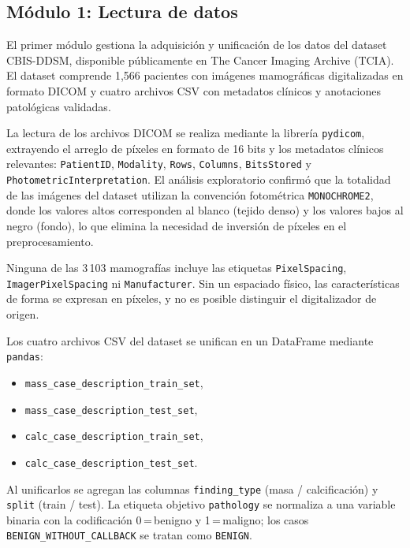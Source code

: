 
\subsection{Módulo 1: Lectura de datos}
\label{sec:modulo1}

El primer módulo gestiona la adquisición y unificación de
los datos del dataset CBIS-DDSM, disponible públicamente
en The Cancer Imaging Archive (TCIA). El dataset comprende 1,566
pacientes con imágenes mamográficas digitalizadas en
formato DICOM y cuatro archivos CSV con metadatos clínicos
y anotaciones patológicas validadas.

La lectura de los archivos DICOM se realiza mediante la
librería \texttt{pydicom}, extrayendo el arreglo de píxeles
en formato de 16 bits y los metadatos clínicos relevantes:
\texttt{PatientID}, \texttt{Modality},
\texttt{Rows}, \texttt{Columns}, \texttt{BitsStored} y
\texttt{PhotometricInterpretation}. El análisis exploratorio
confirmó que la totalidad de las imágenes del dataset
utilizan la convención fotométrica \texttt{MONOCHROME2},
donde los valores altos corresponden al blanco (tejido
denso) y los valores bajos al negro (fondo), lo que
elimina la necesidad de inversión de píxeles en el
preprocesamiento.

Ninguna de las 3\,103 mamografías incluye las etiquetas \texttt{PixelSpacing},
\texttt{ImagerPixelSpacing} ni \texttt{Manufacturer}. Sin un espaciado físico, las características de
forma se expresan en píxeles, y no es posible distinguir el digitalizador de origen.

Los cuatro archivos CSV del dataset se unifican en un
DataFrame mediante \texttt{pandas}:
\begin{itemize}
  \item \texttt{mass\_case\_description\_train\_set},
  \item \texttt{mass\_case\_description\_test\_set},
  \item \texttt{calc\_case\_description\_train\_set},
  \item \texttt{calc\_case\_description\_test\_set}.
\end{itemize}
Al unificarlos se agregan las columnas
\texttt{finding\_type} (masa / calcificación) y
\texttt{split} (train / test). La etiqueta objetivo
\texttt{pathology} se normaliza a una variable binaria con la
codificación 0\,=\,benigno y 1\,=\,maligno; los casos
\texttt{BENIGN\_WITHOUT\_CALLBACK} se tratan como \texttt{BENIGN}.

